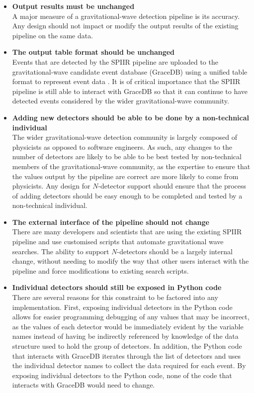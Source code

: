 \documentclass{article}
\begin{document}
\begin{itemize}
    \item \textbf{Output results must be unchanged}\\
        A major measure of a gravitational-wave detection pipeline is its accuracy.
        Any design should not impact or modify the output results of the existing pipeline on the same data.
    \item \textbf{The output table format should be unchanged}\\
        Events that are detected by the SPIIR pipeline are uploaded to the gravitational-wave candidate event database (GraceDB) using a unified table format to represent event data \cite{gracedb}.
        It is of critical importance that the SPIIR pipeline is still able to interact with GraceDB so that it can continue to have detected events considered by the wider gravitational-wave community.
    \item \textbf{Adding new detectors should be able to be done by a non-technical individual}\\
        The wider gravitational-wave detection community is largely composed of physicists as opposed to software engineers.
        As such, any changes to the number of detectors are likely to be able to be best tested by non-technical members of the gravitational-wave community, as the expertise to ensure that the values output by the pipeline are correct are more likely to come from physicists.
        Any design for \(N\)-detector support should ensure that the process of adding detectors should be easy enough to be completed and tested by a non-technical individual.
    \item \textbf{The external interface of the pipeline should not change}\\
        There are many developers and scientists that are using the existing SPIIR pipeline and use customised scripts that automate gravitational wave searches.
        The ability to support \(N\)-detectors should be a largely internal change, without needing to modify the way that other users interact with the pipeline and force modifications to existing search scripts.
    \item \textbf{Individual detectors should still be exposed in Python code}\\
        There are several reasons for this constraint to be factored into any implementation.
        First, exposing individual detectors in the Python code allows for easier programming debugging of any values that may be incorrect, as the values of each detector would be immediately evident by the variable names instead of having be indirectly referenced by knowledge of the data structure used to hold the group of detectors.
        In addition, the Python code that interacts with GraceDB iterates through the list of detectors and uses the individual detector names to collect the data required for each event.
        By exposing individual detectors to the Python code, none of the code that interacts with GraceDB would need to change.
\end{itemize}
\end{document}

